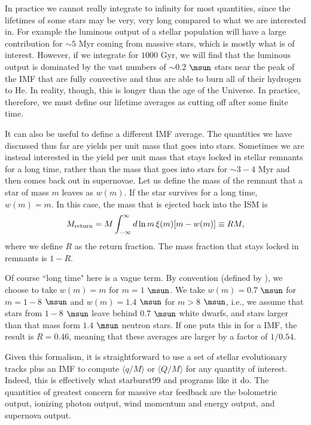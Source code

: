 In practice we cannot really integrate to infinity for most quantities, since the lifetimes of some stars may be very, very long compared to what we are interested in. For example the luminous output of a stellar population will have a large contribution for $\sim 5$ Myr coming from massive stars, which is mostly what is of interest. However, if we integrate for $1000$ Gyr, we will find that the luminous output is dominated by the vast numbers of $\sim 0.2$ $\msun$ stars near the peak of the IMF that are fully convective and thus are able to burn all of their hydrogen to He. In reality, though, this is longer than the age of the Universe. In practice, therefore, we must define our lifetime averages as cutting off after some finite time.

It can also be useful to define a different IMF average. The quantities we have discussed thus far are yields per unit mass that goes into stars. Sometimes we are instead interested in the yield per unit mass that stays locked in stellar remnants for a long time, rather than the mass that goes into stars for $\sim 3-4$ Myr and then comes back out in supernovae. Let us define the mass of the remnant that a star of mass $m$ leaves as $w(m)$. If the star survives for a long time, $w(m) = m$. In this case, the mass that is ejected back into the ISM is
\begin{equation}
M_{\rm return} = M \int_{-\infty}^{\infty} d\ln m \, \xi(m) [m - w(m)] \equiv R M,
\end{equation}
where we define $R$ as the return fraction. The mass fraction that stays locked in remnants is $1-R$.

Of course ``long time" here is a vague term. By convention (defined by \citealt{tinsley80a}), we choose to take $w(m) = m$ for $m=1$ $\msun$. We take $w(m) = 0.7$ $\msun$ for $m=1-8$ $\msun$ and $w(m) = 1.4$ $\msun$ for $m>8$ $\msun$, i.e., we assume that stars from $1-8$ $\msun$ leave behind $0.7$ $\msun$ white dwarfs, and stars larger than that mass form $1.4$ $\msun$ neutron stars. If one puts this in for a \citet{chabrier05a} IMF, the result is $R=0.46$, meaning that these averages are larger by a factor of $1/0.54$.

Given this formalism, it is straightforward to use a set of stellar evolutionary tracks plus an IMF to compute $\langle q/M\rangle$ or $\langle Q/M\rangle$ for any quantity of interest. Indeed, this is effectively what starburst99 \citep{leitherer99a} and programs like it do. The quantities of greatest concern for massive star feedback are the bolometric output, ionizing photon output, wind momentum and energy output, and supernova output.


